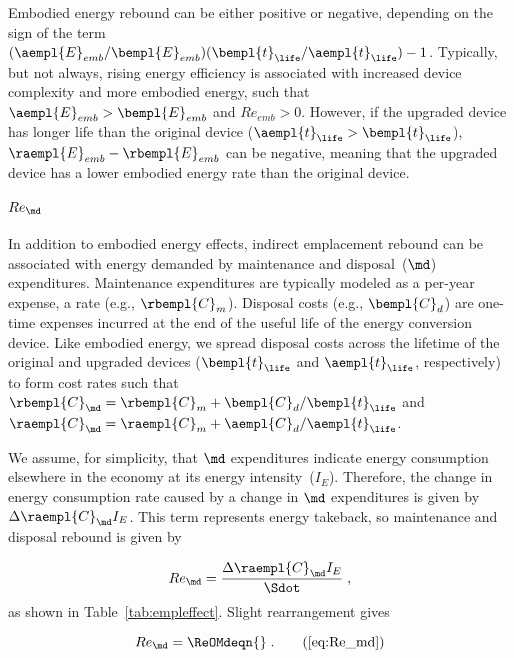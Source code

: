 Embodied energy rebound can be either positive or negative, depending on 
the sign of the term
$(\aempl{E}_{emb}/\bempl{E}_{emb})(\bempl{t}_{\life}/\aempl{t}_{\life}) - 1$.
Typically, but not always,
rising energy efficiency is associated with increased device complexity
and more embodied energy,
such that $\aempl{E}_{emb} > \bempl{E}_{emb}$ and $Re_{emb} > 0$.
However, if the upgraded device has longer life than the original device
($\aempl{t}_{\life} > \bempl{t}_{\life}$),
$\raempl{E}_{emb} - \rbempl{E}_{emb}$ can be negative,
meaning that the upgraded device has a lower embodied energy rate than the original device.


\paragraph{$Re_{\md}$} 
\label{sec:Re_OMd}

In addition to embodied energy effects, 
indirect emplacement rebound 
can be associated with energy demanded by maintenance and disposal~($\md$) expenditures.
Maintenance expenditures are typically modeled as a per-year expense, 
a rate (e.g., $\rbempl{C}_m$).
Disposal costs (e.g., $\bempl{C}_d$) are one-time expenses incurred 
at the end of the useful life of the energy conversion device.
Like embodied energy, we spread disposal costs across the lifetime 
of the original and upgraded devices ($\bempl{t}_{\life}$ and $\aempl{t}_{\life}$, respectively)
to form cost rates such that 
$\rbempl{C}_{\md} = \rbempl{C}_m + \bempl{C}_d/\bempl{t}_{\life}$
and
$\raempl{C}_{\md} = \raempl{C}_m + \aempl{C}_d/\aempl{t}_{\life}$.

We assume, for simplicity, that $\md$ expenditures indicate energy consumption
elsewhere in the economy at its energy intensity~($I_E$).
Therefore, the change in energy consumption rate caused by a change in $\md$ expenditures
is given by $\Delta \raempl{C}_{\md} I_E$.
This term represents energy takeback, so maintenance and disposal rebound is given by

\begin{equation} \label{eq:Re_md_def}
  Re_{\md} = \frac{\Delta \raempl{C}_{\md} I_E}{\Sdot} \; ,
\end{equation}
%
as shown in Table~\ref{tab:empleffect}.
Slight rearrangement gives

\begin{equation}
  Re_{\md} = \ReOMdeqn{} \; . \tag{\ref{eq:Re_md}}
\end{equation}

